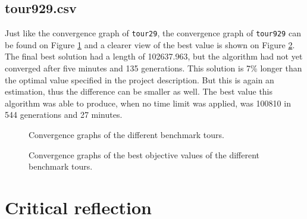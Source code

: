 \documentclass[a4paper,10pt]{article}
\newcommand{\ReplaceMe}[1]{{\color{blue}#1}}
\newcommand{\RemoveMe}[1]{{\color{purple}#1}}
\begin{document}
\subsection{tour929.csv}

%
%
%

Just like the convergence graph of \texttt{tour29}, the convergence graph of \texttt{tour929} can be found on Figure \ref{fig:graphs} and a clearer view of the best value is shown on Figure \ref{fig:best}. The final best solution had a length of 102637.963, but the algorithm had not yet converged after five minutes and 135 generations. This solution is 7\% longer than the optimal value specified in the project description. But this is again an estimation, thus the difference can be smaller as well. The best value this algorithm was able to produce, when no time limit was applied, was 100810 in 544 generations and 27 minutes.

\begin{figure}[p]
\centering
{}
\caption{Convergence graphs of the different benchmark tours.}
\label{fig:graphs}
\end{figure}

\begin{figure}[p]
\centering
{}
\caption{Convergence graphs of the best objective values of the different benchmark tours.}
\label{fig:best}
\end{figure}

\section{Critical reflection}

\end{document}
